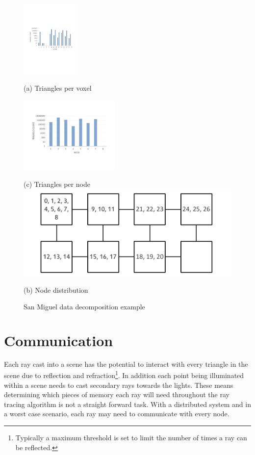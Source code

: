 \begin{figure}[!htb]
  \includegraphics[height=3.8cm]{drawings/VoxelDistribution.pdf}
  
  (a) Triangles per voxel
  
  \includegraphics[height=3.8cm]{drawings/DataDistribution.pdf}
  
  (c) Triangles per node  
\endminipage\hfill
{}
  \includegraphics[width=\linewidth]{drawings/NodeDistribution.pdf}  
  
  (b) Node distribution  
\endminipage
\caption{San Miguel data decomposition example}
\label{fig:san_miguel_data}
\end{figure}


\section{Communication} 
\label{sec:communication}
Each ray cast into a scene has the potential to interact with every triangle in
the scene due to reflection and refraction\footnote{ %
  Typically a maximum threshold is set to limit the number of times a ray
  can be reflected. 
}.  In addition each point being illuminated within a scene needs to cast 
secondary rays towards the lights.  These means determining which pieces of 
memory each ray will need throughout the ray tracing algorithm is not a straight
forward task.  With a distributed system and in a worst case scenario, each ray 
may need to communicate with every node.  

